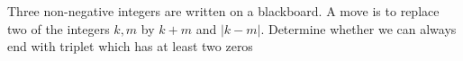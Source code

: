 Three non-negative integers are written on a blackboard. A move is to replace two of the integers $k,m$ by $k+m$ and $|k-m|$. Determine whether we can always end with triplet which has at least two zeros